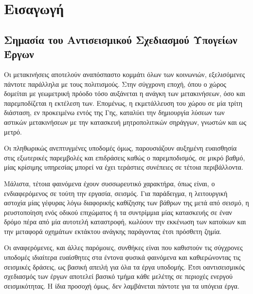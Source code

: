\newpage
\pagestyle{fancy}
\setcounter{page}{1}
\setcounter{chapter}{0}


\chapter{Εισαγωγή}
\label{Ch:intro}

\section{Σημασία του Αντισεισμικού Σχεδιασμού Υπογείων Έργων}

Οι μετακινήσεις αποτελούν αναπόσπαστο κομμάτι όλων των κοινωνιών, εξελισόμενες πάντοτε παράλληλα με τους πολιτισμούς. Στην σύγχρονη εποχή, όπου ο χώρος δομείται με γεωμετρική πρόοδο τόσο αυξάνεται η ανάγκη των μετακινήσεων, όσο και παρεμποδίζεται η εκτέλεση των. Επομένως, η εκμετάλλευση του χώρου σε μία τρίτη διάσταση, εν προκειμένω εντός της Γης, καταλύει την δημιουργία λύσεων των αστικών μετακινήσεων με την κατασκευή μητροπολιτικών σηράγγων, γνωστών και ως μετρό.

Οι πληθωρικώς ανεπτυγμένες υποδομές όμως, παρουσιάζουν αυξημένη ευαισθησία στις εξωτερικές παρεμβολές και επιδράσεις καθώς ο παρεμποδισμός, σε μικρό βαθμό, μίας κρίσιμης υπηρεσίας μπορεί να έχει τεράστιες συνέπειες σε τέτοια περιβάλλοντα.

Μάλιστα, τέτοια φαινόμενα έχουν συσσωρευτικό χαρακτήρα, όπως είναι, ο ενδιαφερόμενος σε τούτη την εργασία, σεισμός. Για παράδειγμα, η λειτουργική αστοχία μίας γέφυρας λόγω διαφορικής καθίζησης των βάθρων της μετά από σεισμό, η ρευστοποίηση ενός οδικού επιχώματος ή τα συντρίμμια μίας κατασκευής σε έναν δρόμο πέρα από μία αυτοτελή καταστροφή, κωλύουν την εκκένωση των κατοίκων και την μεταφορά οχημάτων εκτάκτου ανάγκης παράγοντας έτσι πρόσθετη ζημία.

Οι αναφερόμενες, και άλλες παρόμοιες, συνθήκες είναι που καθιστούν τις σύγχρονες υποδομές ιδιαίτερα ευαίσθητες στα έντονα φυσικά φαινόμενα και καθιερώνοντας τις σεισμικές δράσεις, ως βασική απειλή για όλα τα έργα υποδομής. Έτσι οαντισεισμικός σχεδιασμός των έργων αποτελεί βασικό τμήμα κάθε μελέτης σε περιοχές ενεργού σεισμικότητας. Η ίδια προσοχή όμως, δεν λαμβάνεται πάντοτε για τα υπόγεια έργα.

